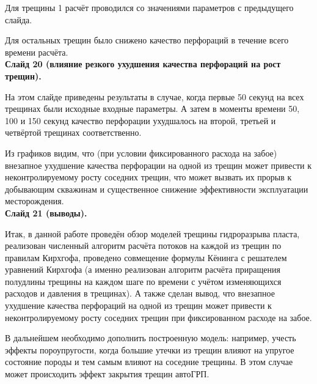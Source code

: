 \documentclass[a4paper, 12pt]{article}
\begin{document}
Для трещины 1 расчёт проводился со значениями параметров с предыдущего слайда.

Для остальных трещин было снижено качество перфораций в течение всего времени расчёта.\\

\textbf{Слайд 20 (влияние резкого ухудшения качества перфораций на рост трещин).}

На этом слайде приведены результаты в случае, когда первые 50 секунд на всех трещинах были исходные входные параметры.
А затем в моменты времени 50, 100 и 150 секунд качество перфорации ухудшалось на второй, третьей и четвёртой трещинах соответственно.

Из графиков видим, что (при условии фиксированного расхода на забое) внезапное ухудшение качества перфорации на одной из трещин может привести к неконтролируемому росту соседних трещин, что может вызвать их прорыв к добывающим скважинам и существенное снижение эффективности эксплуатации месторождения.\\

\textbf{Слайд 21 (выводы).}

Итак, в данной работе проведён обзор моделей трещины гидроразрыва пласта, реализован численный алгоритм расчёта потоков на каждой из трещин по правилам Кирхгофа, проведено совмещение формулы Кёнинга с решателем уравнений Кирхгофа (а именно реализован алгоритм расчёта приращения полудлины трещины на каждом шаге по времени с учётом изменяющихся расходов и давления в трещинах).
А также сделан вывод, что внезапное ухудшение качества перфораций на одной из трещин может привести к неконтролируемому росту соседних трещин при фиксированном расходе на забое.

В дальнейшем необходимо дополнить построенную модель: например, учесть эффекты пороупругости, когда большие утечки из трещин влияют на упругое состояние породы и тем самым влияют на соседние трещины.
В этом случае может происходить эффект закрытия трещин автоГРП.
\end{document}
